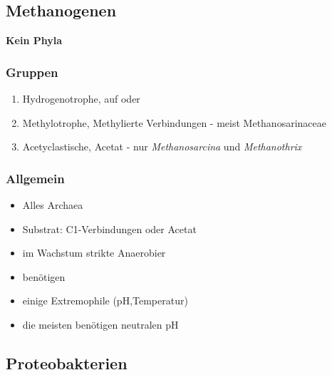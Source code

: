 \subsection{Methanogenen}
\textbf{Kein Phyla}

\subsubsection*{Gruppen}
\begin{enumerate}
	\item Hydrogenotrophe, auf  oder 
	\item Methylotrophe, Methylierte Verbindungen - meist Methanosarinaceae
	\item Acetyclastische, Acetat - nur \textsl{Methanosarcina} und \textsl{Methanothrix}
\end{enumerate}

\subsubsection*{Allgemein}
\begin{itemize}
	\item Alles Archaea
	\item Substrat: C1-Verbindungen oder Acetat
	\item im Wachstum strikte Anaerobier
	\item benötigen 
	\item einige Extremophile (pH,Temperatur)
	\item die meisten benötigen neutralen pH
\end{itemize}

\subsection{Proteobakterien}

